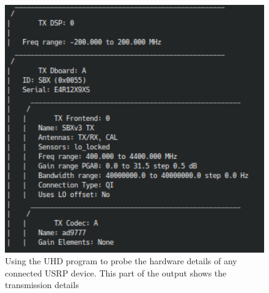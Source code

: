 \begin{figure}[h]
    \begin{centering}
        \includegraphics[width=12cm,keepaspectratio]{Figures/usrp-probe-output_3.png}
        \caption{Using the UHD program to probe the hardware details of any connected USRP device. This part of the output shows the transmission details}
    \label{fig:UHDProbe3}
    \end{centering}
\end{figure}


